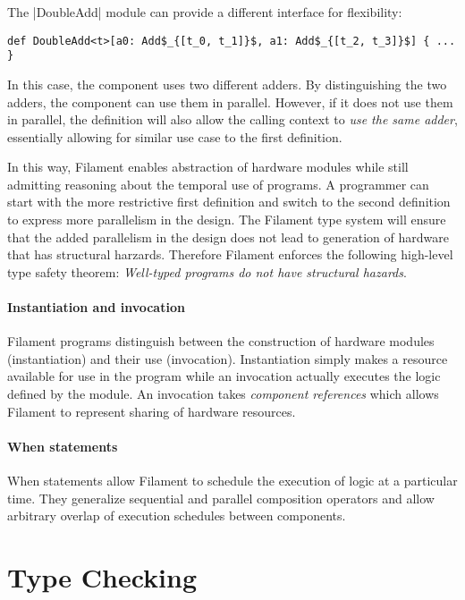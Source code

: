 \documentclass[acmsmall,review,anonymous]{acmart}
\begin{document}
The \code|DoubleAdd| module can provide a different interface for flexibility:
%
\begin{lstlisting}
def DoubleAdd<t>[a0: Add$_{[t_0, t_1]}$, a1: Add$_{[t_2, t_3]}$] { ... }
\end{lstlisting}
%
In this case, the component uses two different adders.
By distinguishing the two adders, the component can use them in parallel.
However, if it does not use them in parallel, the definition will also allow
the calling context to \emph{use the same adder}, essentially allowing for
similar use case to the first definition.

In this way, Filament enables abstraction of hardware modules while still
admitting reasoning about the temporal use of programs.
A programmer can start with the more restrictive first definition and switch to
the second definition to express more parallelism in the design.
The Filament type system will ensure that the added parallelism in the design
does not lead to generation of hardware that has structural harzards.
Therefore Filament enforces the following high-level type safety theorem:
\emph{Well-typed programs do not have structural hazards}.

\paragraph{Instantiation and invocation}
Filament programs distinguish between the construction of hardware modules
(instantiation) and their use (invocation).
Instantiation simply makes a resource available for use in the program while
an invocation actually executes the logic defined by the module.
An invocation takes \emph{component references} which allows Filament to
represent sharing of hardware resources.

\paragraph{When statements}
When statements allow Filament to schedule the execution of logic at a particular
time.
They generalize sequential and parallel composition operators and allow
arbitrary overlap of execution schedules between components.

\section{Type Checking}

\end{document}

